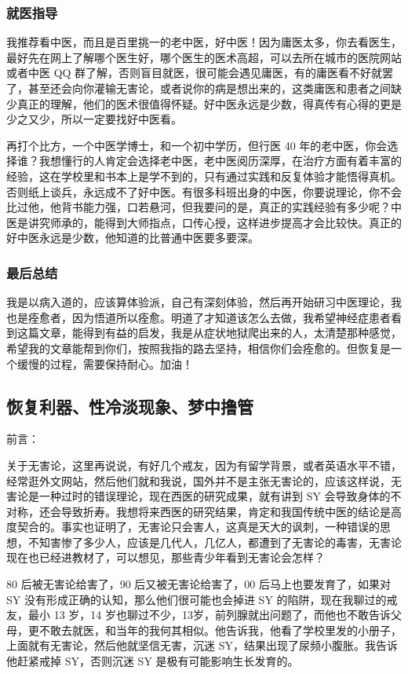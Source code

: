 \documentclass[fontset=founder]{ctexart}
\begin{document}
\subsubsection{就医指导}

我推荐看中医，而且是百里挑一的老中医，好中医！因为庸医太多，你去看医生，最好先在网上了解哪个医生好，哪个医生的医术高超，可以去所在城市的医院网站或者中医 QQ 群了解，否则盲目就医，很可能会遇见庸医，有的庸医看不好就罢了，甚至还会向你灌输无害论，或者说你的病是想出来的，这类庸医和患者之间缺少真正的理解，他们的医术很值得怀疑。好中医永远是少数，得真传有心得的更是少之又少，所以一定要找好中医看。

再打个比方，一个中医学博士，和一个初中学历，但行医 40 年的老中医，你会选择谁？我想懂行的人肯定会选择老中医，老中医阅历深厚，在治疗方面有着丰富的经验，这在学校里和书本上是学不到的，只有通过实践和反复体验才能悟得真机。否则纸上谈兵，永远成不了好中医。有很多科班出身的中医，你要说理论，你不会比过他，他背书能力强，口若悬河，但我要问的是，真正的实践经验有多少呢？中医是讲究师承的，能得到大师指点，口传心授，这样进步提高才会比较快。真正的好中医永远是少数，他知道的比普通中医要多要深。

\subsubsection{最后总结}

我是以病入道的，应该算体验派，自己有深刻体验，然后再开始研习中医理论，我也是痊愈者，因为悟道所以痊愈。明道了才知道该怎么去做，我希望神经症患者看到这篇文章，能得到有益的启发，我是从症状地狱爬出来的人，太清楚那种感觉，希望我的文章能帮到你们，按照我指的路去坚持，相信你们会痊愈的。但恢复是一个缓慢的过程，需要保持耐心。加油！

\subsection{恢复利器、性冷淡现象、梦中撸管}

前言：

关于无害论，这里再说说，有好几个戒友，因为有留学背景，或者英语水平不错，经常逛外文网站，然后他们就和我说，国外并不是主张无害论的，应该这样说，无害论是一种过时的错误理论，现在西医的研究成果，就有讲到 SY 会导致身体的不对称，还会导致折寿。我想将来西医的研究结果，肯定和我国传统中医的结论是高度契合的。事实也证明了，无害论只会害人，这真是天大的讽刺，一种错误的思想，不知害惨了多少人，应该是几代人，几亿人，都遭到了无害论的毒害，无害论现在也已经进教材了，可以想见，那些青少年看到无害论会怎样？

80 后被无害论给害了，90 后又被无害论给害了，00 后马上也要发育了，如果对 SY 没有形成正确的认知，那么他们很可能也会掉进 SY 的陷阱，现在我聊过的戒友，最小 13 岁，14 岁也聊过不少，13岁，前列腺就出问题了，而他也不敢告诉父母，更不敢去就医，和当年的我何其相似。他告诉我，他看了学校里发的小册子，上面就有无害论，然后他就坚信无害，沉迷 SY，结果出现了尿频小腹胀。我告诉他赶紧戒掉 SY，否则沉迷 SY 是极有可能影响生长发育的。
\end{document}
